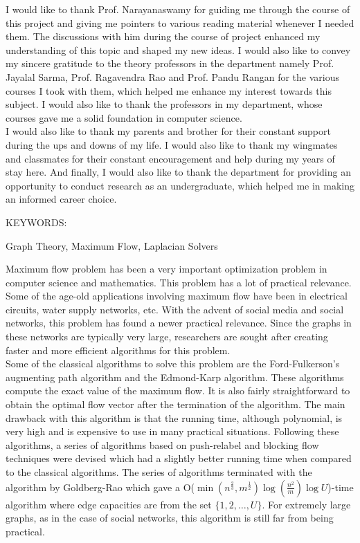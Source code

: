 \documentclass[BTech]{iitmdiss}
\begin{document}
  I would like to thank Prof. Narayanaswamy for guiding me through the course of this project and giving me pointers to various reading material
  whenever I needed them. The discussions with him during the course of project enhanced my understanding of this topic and shaped my new ideas.
  I would also like to convey my sincere gratitude to the theory professors in the department namely Prof. Jayalal Sarma, Prof. Ragavendra Rao and
  Prof. Pandu Rangan for the various courses I took with them, which helped me enhance my interest towards this subject. I would also like to thank the 
  professors in my department, whose courses gave me a solid foundation in computer science.\\
  
  I would also like to thank my parents and brother for their constant support during the ups and downs of my life. I would also like to thank 
  my wingmates and classmates for their constant encouragement and help during my years of stay here. And finally, I would also like to thank the department
  for providing an opportunity to conduct research as an undergraduate, which helped me in making an informed career choice.


\abstract

\noindent KEYWORDS: \hspace*{0.5em} \parbox[t]{4.4in}{Graph Theory,
Maximum Flow, Laplacian Solvers }

\vspace*{24pt}

Maximum flow problem has been a very important optimization problem in computer science and mathematics. This problem has a lot of practical relevance.
Some of the age-old applications involving maximum flow have been in electrical circuits, water supply networks, etc. With the advent of social media
and social networks, this problem has found a newer practical relevance. Since the graphs in these networks are typically very large,
researchers are sought after creating faster and more efficient algorithms for this problem. \\

Some of the classical algorithms to solve this problem are the Ford-Fulkerson's augmenting path algorithm and the Edmond-Karp algorithm. These algorithms
compute the exact value of the maximum flow. It is also fairly straightforward to obtain the optimal flow vector after the termination of the
algorithm. The main drawback with this algorithm is that the running time, although polynomial, is very high and is expensive to use in many practical
situations. Following these algorithms, a series of algorithms based on push-relabel and blocking flow techniques were devised which had a slightly better running time when compared to the 
classical algorithms. The series of algorithms terminated with the algorithm by Goldberg-Rao which gave a O($\min(n^{\frac{2}{3}},m^{\frac{1}{2}}) \log(\frac{n^2}{m}) \log U$)-time algorithm
where edge capacities are from the set $\{1,2,\ldots,U\}$. For 
extremely large graphs, as in the case of social networks, this algorithm is still far from being practical. \\
\end{document}
